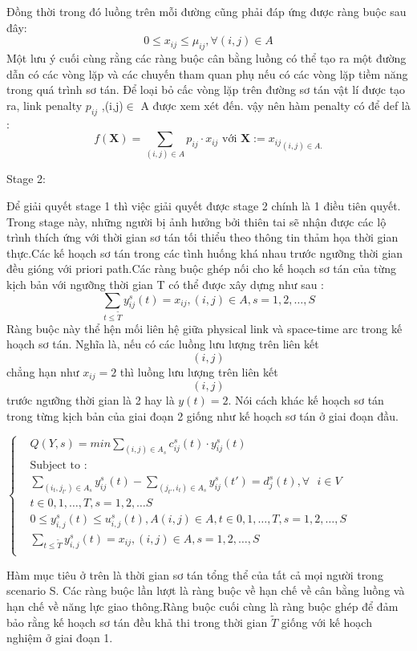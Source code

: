 \documentclass[a4paper]{article}
\begin{document}
Đồng thời trong đó luồng trên mỗi đường cũng phải đáp ứng được ràng buộc sau đây:
\[ 0 \leqslant x_{ij} \leqslant \mu_{ij} , \forall (i,j) \in A\]
Một lưu ý cuối cùng rằng các ràng buộc cân bằng luồng có thể tạo ra một đường dẫn có các vòng lặp và các chuyến tham quan phụ nếu có các vòng lặp tiềm năng trong quá trình sơ tán. Để loại bỏ cấc vòng lặp trên đường sơ tán vật lí được tạo ra, link penalty $p_{ij}$ ,(i,j)$\in$ A được xem xét đến. vậy nên hàm penalty có để def là :
\[ f(\textbf{X}) = \sum _{(i,j) \in A} p_{ij} \cdot x_{ij} \text{ với } \textbf{X} := {x_{ij}}_{(i,j) \in A.}\]


Stage 2:

Để giải quyết stage 1 thì việc giải quyết được stage 2 chính là 1 điều tiên quyết. Trong stage này, những người bị ảnh hưởng bởi thiên tai sẽ nhận được các lộ trình thích ứng với thời gian sơ tán tối thiểu theo thông tin thảm họa thời gian thực.Các kế hoạch sơ tán trong các tình huống khá nhau trước ngưỡng thời gian đều gióng với priori path.Các ràng buộc ghép nối cho kế hoạch sơ tán của từng kịch bản với ngưỡng thời gian T có thể được xây dựng như sau : 
\[\sum_{t \leqslant \tilde{T} } y_{ij}^s (t) = x_{ij} , (i,j) \in A ,s = 1,2,\dots ,S \]
Ràng buộc này thể hện mối liên hệ giữa physical link và space-time arc trong kế hoạch sơ tán. Nghĩa là, nếu có các luồng lưu lượng trên liên kết $$(i,j)$$ chẳng hạn như $x_{i j} = 2$ thì luồng lưu lượng trên liên kết $$(i,j)$$ trước ngưỡng thời gian là 2 hay là $y(t) = 2$. Nói cách khác kế hoạch sơ tán trong từng kịch bản của giai đoạn 2 giống như kế hoạch sơ tán ở giai đoạn đầu.
\begin{center}
    $\begin{cases}
        & Q(Y,s) = min \sum _{(i,j) \in A_s} c_{ij}^s(t) \cdot y_{ij}^s(t) \\
        & \text{Subject to :}\\
        & \sum_{(i_t,j_{t'})\in A_s} y_{ij}^s(t) -\sum_{(j_{t'},i_t)\in A_s} y_{ij}^s(t') = d_j^s(t), \forall  \text{ } i \in V \\
        &t\in {0,1,\dots , T} , s = 1,2,\dots S\\
        & 0 \leqslant y_{i,j}^s (t) \leqslant u_{i,j}^s (t) , A (i,j) \in A,t \in {0,1,\dots , T} , s = 1,2,\dots , S \\
        & \sum_{t\leqslant \tilde{T}}  y_{i,j}^s (t) = x_{ij},(i,j) \in A, s= 1,2,\dots ,S\\
    \end{cases}$
\end{center}
Hàm mục tiêu ở trên là thời gian sơ tán tổng thể của tất cả mọi người trong scenario S. Các ràng buộc lần lượt là ràng buộc về hạn chế về cân bằng luồng và hạn chế về năng lực giao thông.Ràng buộc cuối cùng là ràng buộc ghép để đảm bảo rằng kế hoạch sơ tán đều khả thi trong thời gian $\tilde{T}$ giống với kế hoạch nghiệm ở giai đoạn 1.
\end{document}
